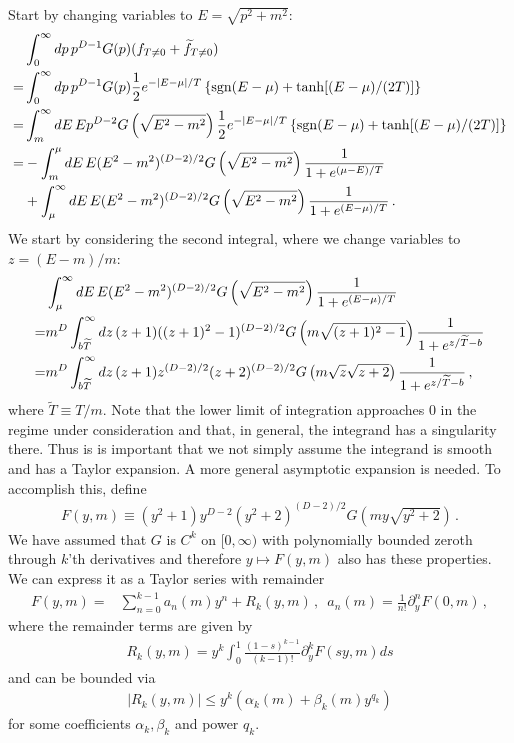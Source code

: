 \documentclass[sn-mathphys,Numbered]{sn-jnl}
\begin{document}
Start by changing variables to $E=\sqrt{p^2+m^2}$:
\begin{align}
    &\int_0^\infty dp\, p^{D-1} G(p)(f_{T\neq 0}+\widetilde{f}_{T\neq 0})\\
=&\int_0^\infty dp\, p^{D-1} G(p)\frac{1}{2}e^{-|E-\mu|/T}\left\{\mathrm{sgn}(E-\mu)+\tanh[(E-\mu)/(2T)]\right\}\notag\\
    =&\int_m^\infty dE \,Ep^{D-2} G\left(\sqrt{E^2-m^2}\right)\frac{1}{2}e^{-|E-\mu|/T}\left\{\mathrm{sgn}(E-\mu)+\tanh[(E-\mu)/(2T)]\right\}\notag\\
    =&-\int_m^{\mu} dE \,E(E^2-m^2)^{(D-2)/2} G\left(\sqrt{E^2-m^2}\right)\frac{1}{1+e^{(\mu-E)/T}}\label{eq:2_int_decomp}\\
    &+\int_{\mu}^\infty dE\, E(E^2-m^2)^{(D-2)/2} G\left(\sqrt{E^2-m^2}\right)
    \frac{1}{1+e^{(E-\mu)/T}}   \,.\notag
\end{align}
We start by considering the second integral, where we change variables to $z=(E-m)/m$:
\begin{align}
&\int_{\mu}^\infty dE\, E(E^2-m^2)^{(D-2)/2} G\left(\sqrt{E^2-m^2}\right)
    \frac{1}{1+e^{(E-\mu)/T}}   \\
    =&m^{D}\int_{b\widetilde{T}}^\infty dz\, (z+1)((z+1)^2-1)^{(D-2)/2} G\left(m\sqrt{(z+1)^2-1}\right)
    \frac{1}{1+e^{z/\widetilde{T}-b}}\notag\\
        =&m^{D}\int_{b\widetilde{T}}^\infty dz\, (z+1)z^{(D-2)/2}(z+2)^{(D-2)/2} G\left(m\sqrt{z}\sqrt{z+2}\right)
    \frac{1}{1+e^{z/\widetilde{T}-b}}\,,\notag
\end{align}
where $\widetilde{T}\equiv T/m$.  Note that the lower limit of integration approaches $0$ in the regime under consideration and that, in general, the integrand has a singularity there.  Thus is is important that we not simply assume the integrand is smooth and has a Taylor expansion.  A more general asymptotic expansion is needed.  To accomplish this, define
\begin{align}
    F(y,m)\equiv(y^2+1)y^{D-2}(y^2+2)^{(D-2)/2}G(my\sqrt{y^2+2})\,.
\end{align}
We have assumed that $G$ is $C^k$ on $[0,\infty)$ with polynomially bounded zeroth through $k$'th derivatives and therefore $y\mapsto F(y,m)$ also has these properties.  We can express it as a Taylor series with remainder
\begin{align}
F(y,m)=&\sum_{n=0}^{k-1} a_n(m)y^n +R_k(y,m)\,, \,\,\,a_n(m)=\frac{1}{n!}\partial_y^n F(0,m)\,,
\end{align}
where the remainder terms are given by
\begin{align}
R_k(y,m)=y^k \int_0^1\frac{(1-s)^{k-1}}{(k-1)!}\partial_y^k F(sy,m)ds
\end{align}
and can be bounded via
\begin{align}
|R_k(y,m)|\leq y^k(\alpha_k(m)+\beta_k(m)y^{q_k})
\end{align}
for some coefficients $\alpha_k,\beta_k$ and power $q_k$.
\end{document}
